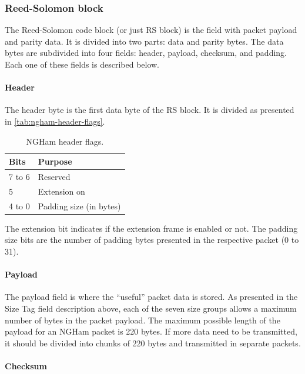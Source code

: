 \subsubsection{Reed-Solomon block}

The Reed-Solomon code block (or just RS block) is the field with packet payload and parity data. It is divided into two parts: data and parity bytes. The data bytes are subdivided into four fields: header, payload, checksum, and padding. Each one of these fields is described below.

\paragraph{Header}

The header byte is the first data byte of the RS block. It is divided as presented in \autoref{tab:ngham-header-flags}.

\begin{table}[!ht]
    \centering
    \begin{tabular}{ll}
        \toprule[1.5pt]
        \textbf{Bits} & \textbf{Purpose} \\
        \midrule
        7 to 6  & Reserved \\
        5       & Extension on \\
        4 to 0  & Padding size (in bytes) \\
        \bottomrule[1.5pt]
    \end{tabular}
    \caption{NGHam header flags.}
    \label{tab:ngham-header-flags}
\end{table}

The extension bit indicates if the extension frame is enabled or not. The padding size bits are the number of padding bytes presented in the respective packet (0 to 31).

\paragraph{Payload}

The payload field is where the “useful” packet data is stored. As presented in the Size Tag field description above, each of the seven size groups allows a maximum number of bytes in the packet payload. The maximum possible length of the payload for an NGHam packet is 220 bytes. If more data need to be transmitted, it should be divided into chunks of 220 bytes and transmitted in separate packets.

\paragraph{Checksum}

